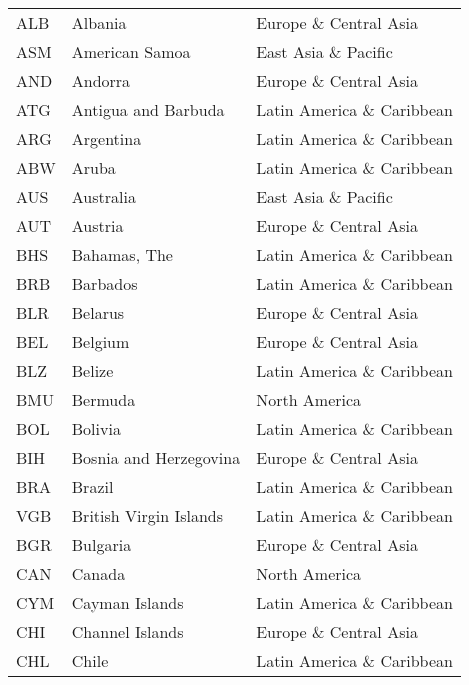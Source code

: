 \documentclass[../main.tex]{subfiles}
\begin{document}
\begin{center}
\begin{longtable}[H]{lll}
ALB       & Albania                        & Europe \& Central Asia     \\
ASM       & American Samoa                 & East Asia \& Pacific       \\
AND       & Andorra                        & Europe \& Central Asia     \\
ATG       & Antigua and Barbuda            & Latin America \& Caribbean \\
ARG       & Argentina                      & Latin America \& Caribbean \\
ABW       & Aruba                          & Latin America \& Caribbean \\
AUS       & Australia                      & East Asia \& Pacific       \\
AUT       & Austria                        & Europe \& Central Asia     \\
BHS       & Bahamas, The                   & Latin America \& Caribbean \\
BRB       & Barbados                       & Latin America \& Caribbean \\
BLR       & Belarus                        & Europe \& Central Asia     \\
BEL       & Belgium                        & Europe \& Central Asia     \\
BLZ       & Belize                         & Latin America \& Caribbean \\
BMU       & Bermuda                        & North America              \\
BOL       & Bolivia                        & Latin America \& Caribbean \\
BIH       & Bosnia and Herzegovina         & Europe \& Central Asia     \\
BRA       & Brazil                         & Latin America \& Caribbean \\
VGB       & British Virgin Islands         & Latin America \& Caribbean \\
BGR       & Bulgaria                       & Europe \& Central Asia     \\
CAN       & Canada                         & North America              \\
CYM       & Cayman Islands                 & Latin America \& Caribbean \\
CHI       & Channel Islands                & Europe \& Central Asia     \\
CHL       & Chile                          & Latin America \& Caribbean \\

\end{longtable}
\end{center}
\end{document}
